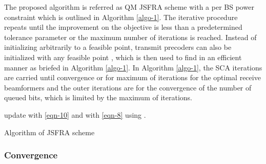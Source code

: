 The proposed algorithm is referred as \ac{QM} \ac{JSFRA} scheme with a per \ac{BS} power constraint which is outlined in Algorithm \ref{algo-1}. The iterative procedure repeats until the improvement on the objective is less than a predetermined tolerance parameter or the maximum number of iterations is reached. Instead of initializing  arbitrarily to a feasible point, transmit precoders can also be initialized with any feasible point , which is then used to find  in an efficient manner as briefed in Algorithm \ref{algo-1}. In Algorithm \ref{algo-1}, the \ac{SCA} iterations are carried until convergence or for maximum of  iterations for the optimal  receive beamformers and the outer iterations are for the convergence of the number of queued bits, which is limited by the maximum of  iterations.
\begin{algorithm}
 \SetAlgoLined
 \DontPrintSemicolon
 \BlankLine
 update  with \eqref{eqn-10} and  with \eqref{eqn-8} using .\;
 \caption{Algorithm of \acs{JSFRA} scheme}
 \label{algo-1}
\end{algorithm}

\subsubsection*{Convergence}


